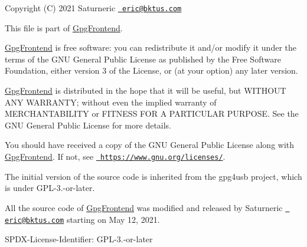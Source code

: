 Copyright (C) 2021 Saturneric \href{mailto:eric@bktus.com}{\texttt{ eric@bktus.\+com}}

This file is part of \mbox{\hyperlink{namespaceGpgFrontend}{Gpg\+Frontend}}.

\mbox{\hyperlink{namespaceGpgFrontend}{Gpg\+Frontend}} is free software\+: you can redistribute it and/or modify it under the terms of the GNU General Public License as published by the Free Software Foundation, either version 3 of the License, or (at your option) any later version.

\mbox{\hyperlink{namespaceGpgFrontend}{Gpg\+Frontend}} is distributed in the hope that it will be useful, but WITHOUT ANY WARRANTY; without even the implied warranty of MERCHANTABILITY or FITNESS FOR A PARTICULAR PURPOSE. See the GNU General Public License for more details.

You should have received a copy of the GNU General Public License along with \mbox{\hyperlink{namespaceGpgFrontend}{Gpg\+Frontend}}. If not, see \href{https://www.gnu.org/licenses/}{\texttt{ https\+://www.\+gnu.\+org/licenses/}}.

The initial version of the source code is inherited from the gpg4usb project, which is under GPL-\/3.-\/or-\/later.

All the source code of \mbox{\hyperlink{namespaceGpgFrontend}{Gpg\+Frontend}} was modified and released by Saturneric \href{mailto:eric@bktus.com}{\texttt{ eric@bktus.\+com}} starting on May 12, 2021.

SPDX-\/\+License-\/\+Identifier\+: GPL-\/3.-\/or-\/later 